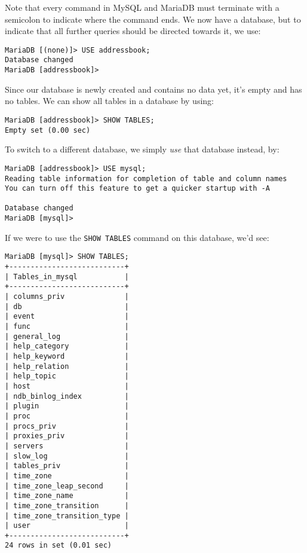 \noindent
Note that every command in MySQL and MariaDB must terminate with a semicolon to indicate where the command ends. We now have a database, but to indicate that all further queries should be directed towards it, we use:

\vspace{-15pt}
\begin{verbatim}
MariaDB [(none)]> USE addressbook;
Database changed
MariaDB [addressbook]> 
\end{verbatim}
\vspace{-10pt}	

\noindent
Since our database is newly created and contains no data yet, it's empty and has no tables. We can show all tables in a database by using:

\vspace{-15pt}
\begin{verbatim}
MariaDB [addressbook]> SHOW TABLES;
Empty set (0.00 sec)
\end{verbatim}
\vspace{-10pt}	

\noindent
To switch to a different database, we simply \textit{use} that database instead, by:

\vspace{-15pt}
\begin{verbatim}
MariaDB [addressbook]> USE mysql;
Reading table information for completion of table and column names
You can turn off this feature to get a quicker startup with -A

Database changed
MariaDB [mysql]> 
\end{verbatim}
\vspace{-10pt}	

\noindent
If we were to use the \verb|SHOW TABLES| command on this database, we'd see:

\vspace{-15pt}
\begin{verbatim}
MariaDB [mysql]> SHOW TABLES;
+---------------------------+
| Tables_in_mysql           |
+---------------------------+
| columns_priv              |
| db                        |
| event                     |
| func                      |
| general_log               |
| help_category             |
| help_keyword              |
| help_relation             |
| help_topic                |
| host                      |
| ndb_binlog_index          |
| plugin                    |
| proc                      |
| procs_priv                |
| proxies_priv              |
| servers                   |
| slow_log                  |
| tables_priv               |
| time_zone                 |
| time_zone_leap_second     |
| time_zone_name            |
| time_zone_transition      |
| time_zone_transition_type |
| user                      |
+---------------------------+
24 rows in set (0.01 sec)
\end{verbatim}
\vspace{-10pt}	

